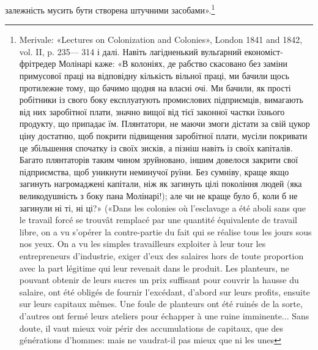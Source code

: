 залежність мусить бути створена штучними засобами».\footnote{
Merivale: «Lectures on Colonization and Colonies», London 1841 and 1842, vol. II, p. 235— 314 і
далі. Навіть лагідненький вульґарний економіст-фрітредер Молінарі каже: «В колоніях, де рабство
скасовано без заміни примусової праці на відповідну кількість вільної праці, ми бачили щось
протилежне тому, що бачимо щодня на власні очі. Ми
бачили, як прості робітники із свого боку експлуатують промислових підприємців, вимагають від них
заробітної плати, значно вищої від тієї законної частки їхнього продукту, що припадає їм.
Плянтатори, не маючи змоги дістати за свій цукор ціну достатню, щоб покрити підвищення заробітної
плати, мусіли покривати це збільшення спочатку із своїх зисків, а пізніш навіть із своїх капіталів.
Багато плянтаторів таким
чином зруйновано, іншим довелося закрити свої підприємства, щоб уникнути
неминучої руїни. Без сумніву, краще якщо загинуть нагромаджені капітали, ніж як загинуть цілі
покоління людей (яка великодушність з боку пана Молінарі!); але чи не краще було б, коли б не
загинули ні ті, ні ці?» («Dans les colonies où l’esclavage a été aboli sans que le travail forcé se
trouvât remplacé par une quantité équivalente de travail libre,
on a vu s’opérer la contre-partie du fait qui se réalise tous les jours sous nos yeux. On a vu les
simples travailleurs exploiter à leur tour les entrepreneurs d’industrie, exiger d’eux des salaires
hors de toute proportion avec la part légitime qui leur revenait dans le produit. Les planteurs, ne
pouvant obtenir de leurs sucres un prix suffisant pour couvrir la hausse du salaire, ont été obligés
de fournir l’excédant, d’abord sur leurs profits, ensuite sur leurs
capitaux mêmes. Une foule de planteurs ont été ruinés de la sorte, d’autres ont fermé leurs ateliers
pour échapper à une ruine imminente... Sans doute, il vaut mieux voir périr des accumulations de
capitaux, que des générations d'hommes: mais ne vaudrat-il pas mieux que ni les unes
}

